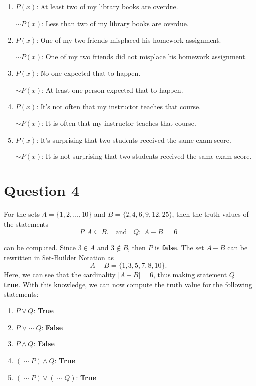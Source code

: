 \documentclass[11pt, oneside]{article}   	%
\begin{document}
\begin{enumerate}[ (a)]    

\item $P(x)$: At least two of my library books are overdue.

$\sim P(x)$: Less than two of my library books are overdue.
\item $P(x)$: One of my two friends misplaced his homework assignment.

$\sim P(x)$: One of my two friends did not misplace his homework assignment.
\item $P(x)$:  No one expected that to happen.

$\sim P(x)$: At least one person expected that to happen.
\item $P(x)$:  It's not often that my instructor teaches that course.

$\sim P(x)$: It is often that my instructor teaches that course.
\item $P(x)$:  It's surprising that two students received the same exam score.

$\sim P(x)$: It is not surprising that two students received the same exam score.

\end{enumerate}

\section*{Question 4}

For the sets $A = \{1,2, \ldots, 10\}$ and $B = \{2, 4, 6, 9, 12, 25\}$, then the truth values of the statements 
$$P : A \subseteq B. \quad \text{and} \quad Q: |A-B| = 6$$

can be computed. Since $3 \in A$ and $3 \notin B$, then $P$ is \textbf{false}. The set $A - B$ can be rewritten in Set-Builder Notation as
$$A-B = \{1,3,5,7,8,10\}.$$
Here, we can see that the cardinality $|A - B| = 6$, thus making statement $Q$ \textbf{true}. With this knowledge, we can now compute the truth value for the following statements:

\begin{enumerate}[ (a)]    

	\item $P \lor Q$: \textbf{True}
	
	\item $P \; \lor \sim Q$: \textbf{False}
	\item $ P \land Q$: \textbf{False}
	\item $(\sim P) \land Q$: \textbf{True}
	\item $(\sim P) \lor (\sim Q)$: \textbf{True}

\end{enumerate}
\end{document}
